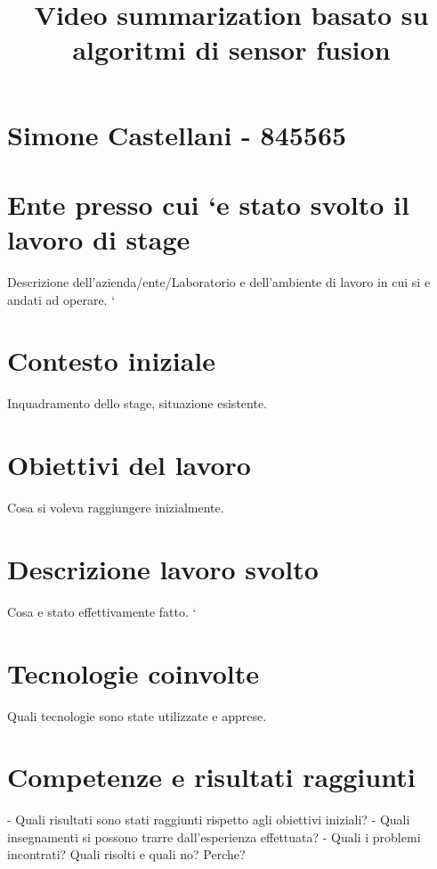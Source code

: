 \documentclass[11pt,draft]{amsart}
\title{Video summarization basato su algoritmi di sensor fusion}
\begin{document}
\maketitle

\section*{Simone Castellani - 845565}

\section{Ente presso cui `e stato svolto il lavoro di stage}
Descrizione dell’azienda/ente/Laboratorio e dell’ambiente di lavoro in cui si e andati ad operare. `

\section{Contesto iniziale}
Inquadramento dello stage, situazione esistente.

\section{Obiettivi del lavoro}
Cosa si voleva raggiungere inizialmente.

\section{Descrizione lavoro svolto}
Cosa e stato effettivamente fatto. `

\section{Tecnologie coinvolte}
Quali tecnologie sono state utilizzate e apprese.

\section{Competenze e risultati raggiunti}
- Quali risultati sono stati raggiunti rispetto agli obiettivi iniziali?
- Quali insegnamenti si possono trarre dall’esperienza effettuata?
- Quali i problemi incontrati? Quali risolti e quali no? Perche?

\cite{soleymani2011multimodal}



\end{document}
